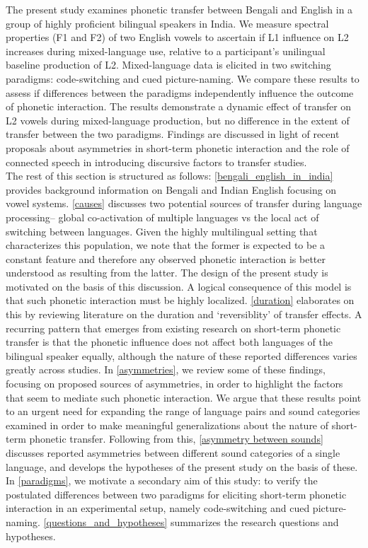 \documentclass[charis,linguex]{glossa}
\begin{document}
The present study examines phonetic transfer between Bengali and English in a group of highly proficient bilingual speakers in India. We measure spectral properties (F1 and F2) of two English vowels to ascertain if L1 influence on L2 increases during mixed-language use, relative to a participant's unilingual baseline production of L2. Mixed-language data is elicited in two switching paradigms: code-switching and cued picture-naming. We compare these results to assess if differences between the paradigms independently influence the outcome of phonetic interaction. The results demonstrate a dynamic effect of transfer on L2 vowels during mixed-language production, but no difference in the extent of transfer between the two paradigms. Findings are discussed in light of recent proposals about asymmetries in short-term phonetic interaction and the role of connected speech in introducing discursive factors to transfer studies.\\


The rest of this section is structured as follows: \ref{bengali_english_in_india} provides background information on Bengali and Indian English focusing on vowel systems. \ref{causes} discusses two potential sources of transfer during language processing-- global co-activation of multiple languages vs the local act of switching between languages. Given the highly multilingual setting that characterizes this population, we note that the former is expected to be a constant feature and therefore any observed phonetic interaction is better understood as resulting from the latter. The design of the present study is motivated on the basis of this discussion. A logical consequence of this model is that such phonetic interaction must be highly localized. \ref{duration} elaborates on this by reviewing literature on the duration and `reversiblity' of transfer effects. A recurring pattern that emerges from existing research on short-term phonetic transfer is that the phonetic influence does not affect both languages of the bilingual speaker equally, although the nature of these reported differences varies greatly across studies. In \ref{asymmetries}, we review some of these findings, focusing on proposed sources of asymmetries, in order to highlight the factors that seem to mediate such phonetic interaction. We argue that these results point to an urgent need for expanding the range of language pairs and sound categories examined in order to make meaningful generalizations about the nature of short-term phonetic transfer. Following from this, \ref{asymmetry between sounds} discusses reported asymmetries between different sound categories of a single language, and develops the hypotheses of the present study on the basis of these. In \ref{paradigms}, we motivate a secondary aim of this study: to verify the postulated differences between two paradigms for eliciting short-term phonetic interaction in an experimental setup, namely code-switching and cued picture-naming. \ref{questions_and_hypotheses} summarizes the research questions and hypotheses.
\end{document}

